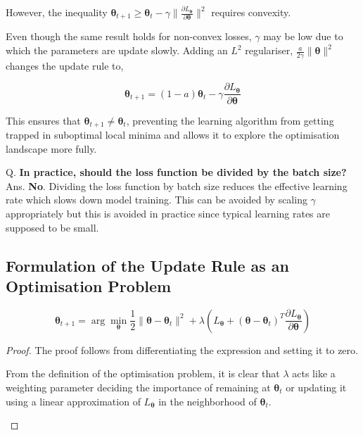 \documentclass[11pt, twosides]{article}
\begin{document}
However, the inequality $\mathbf{\theta}_{t+1} \geq \mathbf{\theta}_{t} - \gamma\|\frac{{\partial}L_{\mathbf{\theta}}}{{\partial}\mathbf{\theta}}\|^{2}$ requires convexity.

Even though the same result holds for non-convex losses, $\gamma$ may be low due to which the parameters are update slowly. Adding an $L^{2}$ regulariser, $\frac{a}{2\gamma}\|\mathbf{\theta}\|^{2}$ changes the update rule to,

\begin{equation*}
    \mathbf{\theta}_{t + 1} = (1 - a)\mathbf{\theta}_{t} - \gamma\frac{{\partial}L_{\mathbf{\theta}}}{{\partial}\mathbf{\theta}}
\end{equation*}

This ensures that $\mathbf{\theta}_{t + 1} \neq \mathbf{\theta}_{t}$, preventing the learning algorithm from getting trapped in suboptimal local minima and allows it to explore the optimisation landscape more fully.

\begin{flushleft}
Q. \textbf{In practice, should the loss function be divided by the batch size?}\\

Ans. \color{blue}
\textbf{No}. Dividing the loss function by batch size reduces the effective learning rate which slows down model training. This can be avoided by scaling $\gamma$ appropriately but this is avoided in practice since typical learning rates are supposed to be small.
\end{flushleft}

\subsection{Formulation of the Update Rule as an Optimisation Problem}
\begin{equation*}
    \mathbf{\theta}_{t + 1} = \arg\min_{\mathbf{\theta}} \frac{1}{2}\|\mathbf{\theta} - \mathbf{\theta}_{t}\|^{2} + \lambda\left(L_{\mathbf{\theta}} + \left(\mathbf{\theta} - \mathbf{\theta}_{t}\right)^{T}\frac{{\partial}L_{\mathbf{\theta}}}{{\partial}\mathbf{\theta}}\right)
\end{equation*}
\begin{proof}
The proof follows from differentiating the expression and setting it to zero.
\begin{flushleft}
From the definition of the optimisation problem, it is clear that $\lambda$ acts like a weighting parameter deciding the importance of remaining at $\mathbf{\theta}_{t}$ or updating it using a linear approximation of $L_{\mathbf{\theta}}$ in the neighborhood of $\mathbf{\theta}_{t}$.
\end{flushleft}
\end{proof}
\end{document}
